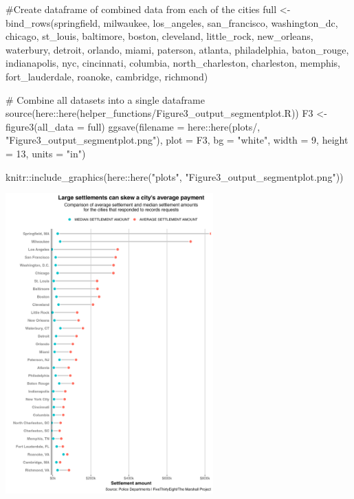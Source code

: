\documentclass[
  letterpaper,
  DIV=11,
  numbers=noendperiod]{scrartcl}
\newenvironment{Shaded}{\begin{snugshade}}{\end{snugshade}}
\newcommand{\AttributeTok}[1]{\textcolor[rgb]{0.40,0.45,0.13}{#1}}
\newcommand{\CommentTok}[1]{\textcolor[rgb]{0.37,0.37,0.37}{#1}}
\newcommand{\DecValTok}[1]{\textcolor[rgb]{0.68,0.00,0.00}{#1}}
\newcommand{\FunctionTok}[1]{\textcolor[rgb]{0.28,0.35,0.67}{#1}}
\newcommand{\NormalTok}[1]{\textcolor[rgb]{0.00,0.23,0.31}{#1}}
\newcommand{\OtherTok}[1]{\textcolor[rgb]{0.00,0.23,0.31}{#1}}
\newcommand{\SpecialCharTok}[1]{\textcolor[rgb]{0.37,0.37,0.37}{#1}}
\newcommand{\StringTok}[1]{\textcolor[rgb]{0.13,0.47,0.30}{#1}}
\begin{document}
\begin{Shaded}
\begin{Highlighting}[]
\CommentTok{\#Create dataframe of combined data from each of the cities}
\NormalTok{full }\OtherTok{\textless{}{-}} \FunctionTok{bind\_rows}\NormalTok{(springfield, milwaukee, los\_angeles, san\_francisco, washington\_dc, }
\NormalTok{                      chicago, st\_louis, baltimore, boston, cleveland, little\_rock, }
\NormalTok{                      new\_orleans, waterbury, detroit, orlando, miami, paterson, atlanta, }
\NormalTok{                      philadelphia, baton\_rouge, indianapolis, nyc, cincinnati, columbia, }
\NormalTok{                      north\_charleston, charleston, memphis, fort\_lauderdale, roanoke, }
\NormalTok{                      cambridge, richmond)}

\CommentTok{\# Combine all datasets into a single dataframe}
\FunctionTok{source}\NormalTok{(here}\SpecialCharTok{::}\FunctionTok{here}\NormalTok{(}\StringTok{\textquotesingle{}helper\_functions/Figure3\_output\_segmentplot.R\textquotesingle{}}\NormalTok{))}
\NormalTok{F3 }\OtherTok{\textless{}{-}} \FunctionTok{figure3}\NormalTok{(}\AttributeTok{all\_data =}\NormalTok{ full)}
\FunctionTok{ggsave}\NormalTok{(}\AttributeTok{filename =}\NormalTok{ here}\SpecialCharTok{::}\FunctionTok{here}\NormalTok{(}\StringTok{\textquotesingle{}plots/\textquotesingle{}}\NormalTok{, }\StringTok{"Figure3\_output\_segmentplot.png"}\NormalTok{),}
       \AttributeTok{plot =}\NormalTok{ F3, }
       \AttributeTok{bg =} \StringTok{"white"}\NormalTok{, }\AttributeTok{width =} \DecValTok{9}\NormalTok{, }\AttributeTok{height =} \DecValTok{13}\NormalTok{, }\AttributeTok{units =} \StringTok{"in"}\NormalTok{)}

\NormalTok{knitr}\SpecialCharTok{::}\FunctionTok{include\_graphics}\NormalTok{(here}\SpecialCharTok{::}\FunctionTok{here}\NormalTok{(}\StringTok{"plots"}\NormalTok{, }\StringTok{"Figure3\_output\_segmentplot.png"}\NormalTok{))}
\end{Highlighting}
\end{Shaded}

\includegraphics[width=0.6\textwidth,height=\textheight]{plots/Figure3_output_segmentplot.png}
\end{document}
